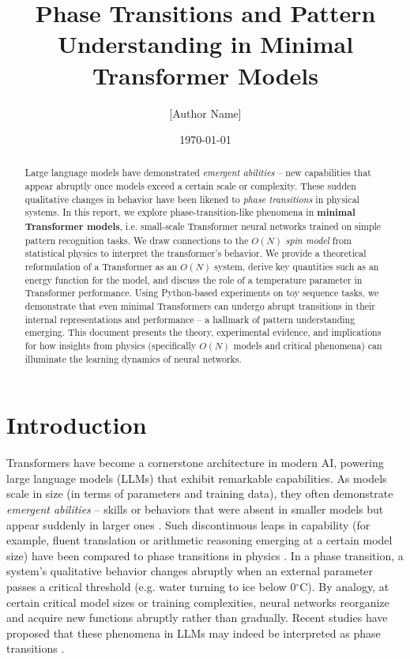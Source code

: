 \documentclass[12pt]{article}
\title{Phase Transitions and Pattern Understanding in Minimal Transformer Models}
\author{[Author Name]}
\date{\today}
\begin{document}
\maketitle
\thispagestyle{empty}
\begin{abstract}
Large language models have demonstrated \textit{emergent abilities} -- new capabilities that appear abruptly once models exceed a certain scale or complexity. These sudden qualitative changes in behavior have been likened to \textit{phase transitions} in physical systems. In this report, we explore phase-transition-like phenomena in \textbf{minimal Transformer models}, i.e. small-scale Transformer neural networks trained on simple pattern recognition tasks. We draw connections to the $O(N)$ \emph{spin model} from statistical physics to interpret the transformer's behavior. We provide a theoretical reformulation of a Transformer as an $O(N)$ system, derive key quantities such as an energy function for the model, and discuss the role of a temperature parameter in Transformer performance. Using Python-based experiments on toy sequence tasks, we demonstrate that even minimal Transformers can undergo abrupt transitions in their internal representations and performance -- a hallmark of pattern understanding emerging. This document presents the theory, experimental evidence, and implications for how insights from physics (specifically $O(N)$ models and critical phenomena) can illuminate the learning dynamics of neural networks.
\end{abstract}

\clearpage
\tableofcontents
\clearpage

\section{Introduction}
Transformers \citep{vaswani2017} have become a cornerstone architecture in modern AI, powering large language models (LLMs) that exhibit remarkable capabilities. As models scale in size (in terms of parameters and training data), they often demonstrate \textit{emergent abilities} -- skills or behaviors that were absent in smaller models but appear suddenly in larger ones \citep{brown2020,wei2022}. Such discontinuous leaps in capability (for example, fluent translation or arithmetic reasoning emerging at a certain model size) have been compared to phase transitions in physics \citep{wei2022}. In a phase transition, a system's qualitative behavior changes abruptly when an external parameter passes a critical threshold (e.g. water turning to ice below 0$^\circ$C). By analogy, at certain critical model sizes or training complexities, neural networks reorganize and acquire new functions abruptly rather than gradually. Recent studies have proposed that these phenomena in LLMs may indeed be interpreted as phase transitions \citep{wei2022,sun2025}.
\end{document}
